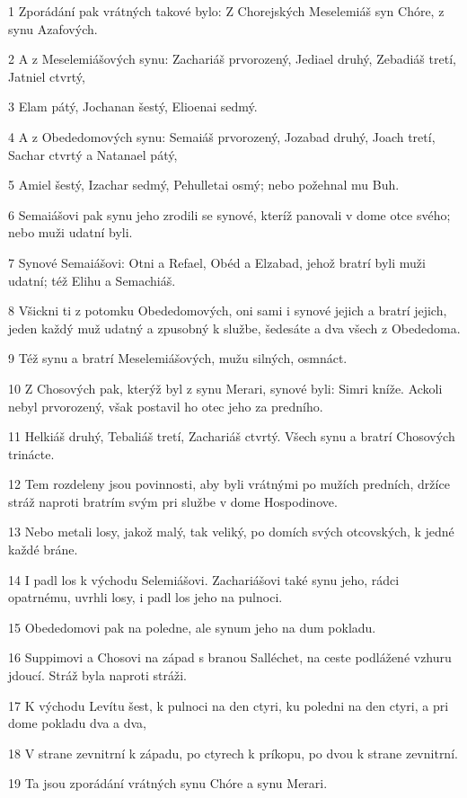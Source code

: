 \par 1 Zporádání pak vrátných takové bylo: Z Chorejských Meselemiáš syn Chóre, z synu Azafových.
\par 2 A z Meselemiášových synu: Zachariáš prvorozený, Jediael druhý, Zebadiáš tretí, Jatniel ctvrtý,
\par 3 Elam pátý, Jochanan šestý, Elioenai sedmý.
\par 4 A z Obededomových synu: Semaiáš prvorozený, Jozabad druhý, Joach tretí, Sachar ctvrtý a Natanael pátý,
\par 5 Amiel šestý, Izachar sedmý, Pehulletai osmý; nebo požehnal mu Buh.
\par 6 Semaiášovi pak synu jeho zrodili se synové, kteríž panovali v dome otce svého; nebo muži udatní byli.
\par 7 Synové Semaiášovi: Otni a Refael, Obéd a Elzabad, jehož bratrí byli muži udatní; též Elihu a Semachiáš.
\par 8 Všickni ti z potomku Obededomových, oni sami i synové jejich a bratrí jejich, jeden každý muž udatný a zpusobný k službe, šedesáte a dva všech z Obededoma.
\par 9 Též synu a bratrí Meselemiášových, mužu silných, osmnáct.
\par 10 Z Chosových pak, kterýž byl z synu Merari, synové byli: Simri kníže. Ackoli nebyl prvorozený, však postavil ho otec jeho za predního.
\par 11 Helkiáš druhý, Tebaliáš tretí, Zachariáš ctvrtý. Všech synu a bratrí Chosových trinácte.
\par 12 Tem rozdeleny jsou povinnosti, aby byli vrátnými po mužích predních, držíce stráž naproti bratrím svým pri službe v dome Hospodinove.
\par 13 Nebo metali losy, jakož malý, tak veliký, po domích svých otcovských, k jedné každé bráne.
\par 14 I padl los k východu Selemiášovi. Zachariášovi také synu jeho, rádci opatrnému, uvrhli losy, i padl los jeho na pulnoci.
\par 15 Obededomovi pak na poledne, ale synum jeho na dum pokladu.
\par 16 Suppimovi a Chosovi na západ s branou Salléchet, na ceste podlážené vzhuru jdoucí. Stráž byla naproti stráži.
\par 17 K východu Levítu šest, k pulnoci na den ctyri, ku poledni na den ctyri, a pri dome pokladu dva a dva,
\par 18 V strane zevnitrní k západu, po ctyrech k príkopu, po dvou k strane zevnitrní.
\par 19 Ta jsou zporádání vrátných synu Chóre a synu Merari.
